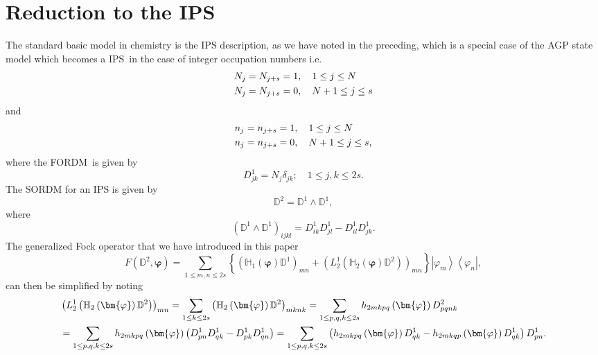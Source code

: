 \documentclass{preprint}
\begin{document}
\section{Reduction to the IPS \label{IPS}}

The standard basic model in chemistry is the IPS description, as we have
noted in the preceding, which is a special case of the AGP state model which
becomes a IPS\ in the case of integer occupation numbers i.e.
\begin{align}
N_{j} & =N_{j+s}=1,\quad1\leq j\leq N  \notag \\
N_{j} & =N_{j+s}=0,\quad N+1\leq j\leq s
\end{align}
and%
\begin{align}
n_{j} & =n_{j+s}=1,\quad1\leq j\leq N  \notag \\
n_{j} & =n_{j+s}=0,\quad N+1\leq j\leq s,
\end{align}
where the FORDM\ is given by
\begin{equation}
D_{jk}^{1}=N_{j}\delta_{jk};\quad1\leq j,k\leq2s.
\end{equation}
The SORDM for an IPS is given by
\begin{equation}
\mathbb{D}^{2}=\mathbb{D}^{1}\wedge\mathbb{D}^{1},
\end{equation}
where
\begin{equation}
\left( \mathbb{D}^{1}\wedge\mathbb{D}^{1}\right)
_{ijkl}=D_{ik}^{1}D_{jl}^{1}-D_{il}^{1}D_{jk}^{1}.
\end{equation}
The generalized Fock operator that we have introduced in this paper
\begin{equation}
F\left( \mathbb{D}^{2},\bm{\varphi}\right) =\sum_{1\leq m,n\leq2s}\left\{
\left( \mathbb{H}_{1}\left( \bm{\varphi}\right) \mathbb{D}^{1}\right)
_{mn}+\left( L_{2}^{1}\left( \mathbb{H}_{2}\left( \bm{\varphi}\right)
\mathbb{D}^{2}\right) \right) _{mn}\right\} \left\vert \varphi
_{m}\right\rangle \left\langle \varphi_{n}\right\vert ,  \label{F1}
\end{equation}
can then be simplified by noting
\begin{align}
& \left( L_{2}^{1}\left( \mathbb{H}_{2}\left( \bm{\varphi}\right) \mathbb{D}%
^{2}\right) \right) _{mn}=\sum_{1\leq k\leq2s}\left( \mathbb{H}_{2}\left( %
\bm{\varphi}\right) \mathbb{D}^{2}\right) _{mknk}=\sum_{1\leq
p,q,k\leq2s}h_{2mkpq}\left( \bm{\varphi}\right) D_{pqnk}^{2}  \notag \\
& =\sum_{1\leq p,q,k\leq2s}h_{2mkpq}\left( \bm{\varphi}\right) \left(
D_{pn}^{1}D_{qk}^{1}-D_{pk}^{1}D_{qn}^{1}\right) =\sum_{1\leq p,q,k\leq
2s}\left( h_{2mkpq}\left( \bm{\varphi}\right) D_{qk}^{1}-h_{2mkqp}\left( %
\bm{\varphi}\right) D_{qk}^{1}\right) D_{pn}^{1}.
\end{align}
\end{document}
